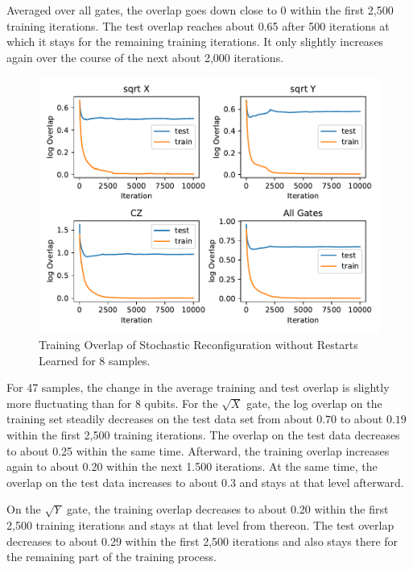 Averaged over all gates, the overlap goes down close to 0 within the first 2,500 training iterations. The test 
overlap reaches about 0.65 after 500 iterations at which it stays for the remaining training iterations. It only 
slightly increases again over the course of the next about 2,000 iterations.


\begin{figure}[H]
  \centering
  \includegraphics[width=\textwidth]{figures/results/SR-no-restarts-learned/avgOverlap_8.pdf}
  \caption[Training Overlap of Stochastic Reconfiguration without Restarts Learned]{Training 
  Overlap of Stochastic Reconfiguration without Restarts Learned for 8 samples.}
  \label{fig:sr_tvd}
\end{figure}

For 47 samples, the change in the average training and test overlap is slightly more fluctuating than for 8 qubits. For the 
$\sqrt{X}$ gate, the log overlap on the training set steadily decreases on the test data set from 
about $0.70$ to about $0.19$ within the first 2,500 training iterations. The overlap on the test data 
decreases to about 0.25 within the same time. Afterward, the training overlap increases again to about 
0.20 within the next 1.500 iterations. At the same time, the overlap on the test data increases to about 
0.3 and stays at that level afterward.

On the $\sqrt{Y}$ gate, the training overlap decreases to about 0.20 within the first 2,500 training iterations 
and stays at that level from thereon. The test overlap decreases to about 0.29 within the first 2,500 iterations 
and also stays there for the remaining part of the training process.

